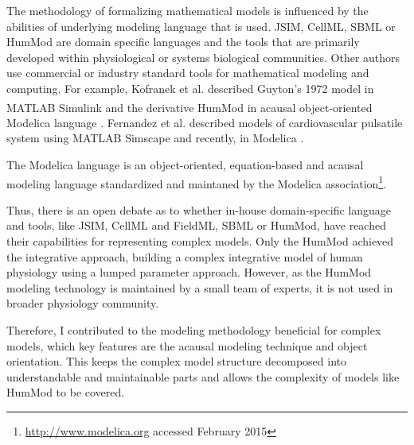 The methodology of formalizing mathematical models is influenced by the abilities of underlying modeling language that is used. 
JSIM, CellML, SBML or HumMod are domain specific languages and the tools that are primarily developed within physiological or systems biological communities. 
Other authors use commercial or industry standard tools for mathematical modeling and computing. For example, Kofranek et al. described Guyton's 1972 model in MATLAB\textsuperscript{\textregistered} Simulink \cite{Kofranek2010} and the derivative HumMod in acausal object-oriented Modelica language \cite{Kofranek2011hummod,kofranek2013hummod}. Fernandez et al. described models of cardiovascular pulsatile system using MATLAB Simscape  \cite{FernandezDeCanete2013} and recently, in Modelica  \cite{FernandezdeCanete2014}.

The Modelica language is an object-oriented, equation-based and acausal modeling language standardized and maintaned by the Modelica association\footnote{\url{http://www.modelica.org} accessed February 2015}.

Thus, there is an open debate as to whether in-house domain-specific language and tools, like JSIM, CellML and FieldML, SBML or HumMod, have reached their capabilities for representing complex models. Only the HumMod achieved the integrative approach, building a complex integrative model of human physiology using a lumped parameter approach. However, as the HumMod modeling technology is maintained by a small team of experts, it is not used in broader physiology community. 

Therefore, I contributed to the modeling methodology beneficial for complex models, which key features are the acausal modeling technique and object orientation. This keeps the complex model structure decomposed into understandable and maintainable parts and allows the complexity of models like HumMod to be covered. 

